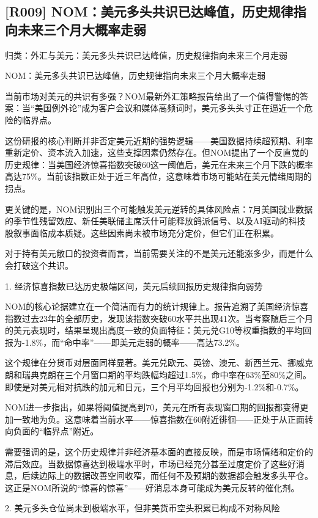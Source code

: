 \documentclass[11pt]{ctexart}
\begin{document}
\subsection{[R009] NOM：美元多头共识已达峰值，历史规律指向未来三个月大概率走弱}
{\small\color{refgray}归类：外汇与美元：美元多头共识已达峰值，历史规律指向未来三个月走弱}

NOM：美元多头共识已达峰值，历史规律指向未来三个月大概率走弱

当前市场对美元的共识有多强？NOM最新外汇策略报告给出了一个值得警惕的答案：当“美国例外论”成为客户会议和媒体高频词时，美元多头头寸正在逼近一个危险的临界点。

这份研报的核心判断并非否定美元近期的强势逻辑——美国数据持续超预期、利率重新定价、资本流入加速，这些支撑因素仍然存在。但NOM提出了一个反直觉的历史规律：当美国经济惊喜指数突破60这一阈值后，美元在未来三个月下跌的概率高达75\%。当前该指数正处于近三年高位，这意味着市场可能站在美元情绪周期的拐点。

更关键的是，NOM识别出三个可能触发美元逆转的具体风险点：7月美国就业数据的季节性残留效应、新任美联储主席沃什可能释放鸽派信号、以及AI驱动的科技股叙事面临成本质疑。这些因素尚未被市场充分定价，但它们正在积累。

对于持有美元敞口的投资者而言，当前需要关注的不是美元还能涨多少，而是什么会打破这个共识。

1. 经济惊喜指数已达历史极端区间，美元后续回报历史规律指向弱势

NOM的核心论据建立在一个简洁而有力的统计规律上。报告追溯了美国经济惊喜指数过去23年的全部历史，发现该指数突破60水平共出现41次。当考察随后三个月的美元表现时，结果呈现出高度一致的负面特征：美元兑G10等权重指数的平均回报为-1.8\%，而“命中率”——即美元走弱的概率——高达73.2\%。

这个规律在分货币对层面同样显著。美元兑欧元、英镑、澳元、新西兰元、挪威克朗和瑞典克朗在三个月窗口期的平均跌幅均超过1.5\%，命中率在63\%至80\%之间。即使是对美元相对抗跌的加元和日元，三个月平均回报也分别为-1.2\%和-0.7\%。

NOM进一步指出，如果将阈值提高到70，美元在所有表现窗口期的回报都变得更加一致地为负。这意味着当前水平——惊喜指数在60附近徘徊——正处于从正面转向负面的“临界点”附近。

需要强调的是，这个历史规律并非经济基本面的直接反映，而是市场情绪和定价的滞后效应。当数据惊喜达到极端水平时，市场已经充分甚至过度定价了这些好消息，后续边际上的数据改善空间收窄，而任何不及预期的数据都会触发多头平仓。这正是NOM所说的“惊喜的惊喜”——好消息本身可能成为美元反转的催化剂。

2. 美元多头仓位尚未到极端水平，但非美货币空头积累已构成不对称风险
\end{document}
